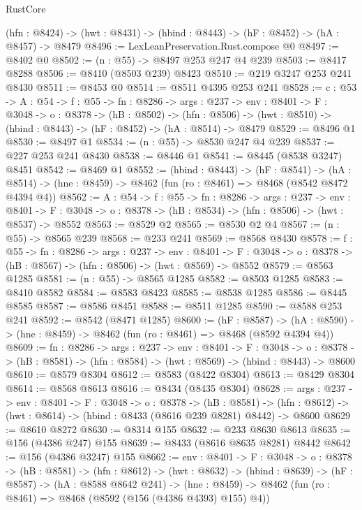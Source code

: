 \begin{lexlean}{RustCore}
\begin{coremodule}
  (hfn : @8424) -> (hwt : @8431) -> (hbind : @8443) -> (hF : @8452) -> (hA : @8457) -> @8479
@8496 := LexLeanPreservation.Rust.compose @0
@8497 := @8402 @0
@8502 := (n : @55) -> @8497 @253 @247 @4 @239
@8503 := @8417 @8288
@8506 := @8410 (@8503 @239) @8423
@8510 := @219 @3247 @253 @241 @8430
@8511 := @8453 @0
@8514 := @8511 @4395 @253 @241
@8528 := {c : @53} ->
  {A : @54} ->
  {f : @55} ->
  {fn : @8286} ->
  {args : @237} ->
  {env : @8401} ->
  {F : @3048} ->
  {o : @8378} ->
  (hB : @8502) ->
  (hfn : @8506) -> (hwt : @8510) -> (hbind : @8443) -> (hF : @8452) -> (hA : @8514) -> @8479
@8529 := @8496 @1
@8530 := @8497 @1
@8534 := (n : @55) -> @8530 @247 @4 @239
@8537 := @227 @253 @241 @8430
@8538 := @8446 @1
@8541 := @8445 (@8538 @3247) @8451
@8542 := @8469 @1
@8552 := (hbind : @8443) ->
  (hF : @8541) ->
  (hA : @8514) -> (hne : @8459) -> @8462 (fun (ro : @8461) => @8468 (@8542 @8472 @4394 @4))
@8562 := {A : @54} ->
  {f : @55} ->
  {fn : @8286} ->
  {args : @237} ->
  {env : @8401} ->
  {F : @3048} -> {o : @8378} -> (hB : @8534) -> (hfn : @8506) -> (hwt : @8537) -> @8552
@8563 := @8529 @2
@8565 := @8530 @2 @4
@8567 := (n : @55) -> @8565 @239
@8568 := @233 @241
@8569 := @8568 @8430
@8578 := {f : @55} ->
  {fn : @8286} ->
  {args : @237} ->
  {env : @8401} ->
  {F : @3048} -> {o : @8378} -> (hB : @8567) -> (hfn : @8506) -> (hwt : @8569) -> @8552
@8579 := @8563 @1285
@8581 := (n : @55) -> @8565 @1285
@8582 := @8503 @1285
@8583 := @8410 @8582
@8584 := @8583 @8423
@8585 := @8538 @1285
@8586 := @8445 @8585
@8587 := @8586 @8451
@8588 := @8511 @1285
@8590 := @8588 @253 @241
@8592 := @8542 (@8471 @1285)
@8600 := (hF : @8587) ->
  (hA : @8590) -> (hne : @8459) -> @8462 (fun (ro : @8461) => @8468 (@8592 @4394 @4))
@8609 := {fn : @8286} ->
  {args : @237} ->
  {env : @8401} ->
  {F : @3048} ->
  {o : @8378} -> (hB : @8581) -> (hfn : @8584) -> (hwt : @8569) -> (hbind : @8443) -> @8600
@8610 := @8579 @8304
@8612 := @8583 (@8422 @8304)
@8613 := @8429 @8304
@8614 := @8568 @8613
@8616 := @8434 (@8435 @8304)
@8628 := {args : @237} ->
  {env : @8401} ->
  {F : @3048} ->
  {o : @8378} ->
  (hB : @8581) ->
  (hfn : @8612) -> (hwt : @8614) -> (hbind : @8433 (@8616 @239 @8281) @8442) -> @8600
@8629 := @8610 @8272
@8630 := @8314 @155
@8632 := @233 @8630 @8613
@8635 := @156 (@4386 @247) @155
@8639 := @8433 (@8616 @8635 @8281) @8442
@8642 := @156 (@4386 @3247) @155
@8662 := {env : @8401} ->
  {F : @3048} ->
  {o : @8378} ->
  (hB : @8581) ->
  (hfn : @8612) ->
  (hwt : @8632) ->
  (hbind : @8639) ->
  (hF : @8587) ->
  (hA : @8588 @8642 @241) ->
  (hne : @8459) -> @8462 (fun (ro : @8461) => @8468 (@8592 (@156 (@4386 @4393) @155) @4))

\end{coremodule}
\end{lexlean}
